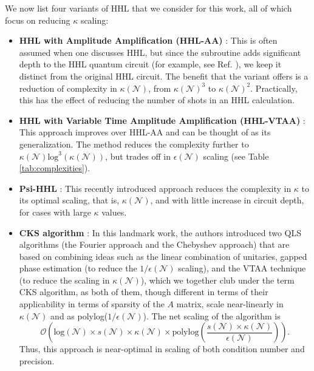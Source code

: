 \documentclass[%
 reprint,
 superscriptaddress,
 amsmath,amssymb,
 aps,
 pra,
floatfix,
nofootinbib,
]{revtex4-2}
\theoremstyle{definition}
\theoremstyle{remark}
\begin{document}
We now list four variants of HHL that we consider for this work, all of which focus on reducing $\kappa$ scaling: 

\begin{itemize}
\item 
\textbf{HHL with Amplitude Amplification (HHL-AA)} \cite{Harrow2009QuantumEquations, Brassard}: 
This is often assumed when one discusses HHL, but since the subroutine adds significant depth to the HHL quantum circuit (for example, see Ref. \cite{morales}), we keep it distinct from the original HHL circuit. The benefit that the variant offers is a reduction of complexity in $\kappa(\mathcal{N})$, from $\kappa(\mathcal{N})^3$ to $\kappa(\mathcal{N})^2$. Practically, this has the effect of reducing the number of shots in an HHL calculation. 

\item 
\textbf{HHL with Variable Time Amplitude Amplification (HHL-VTAA)} \cite{ambainis}: 
This approach improves over HHL-AA and can be thought of as its generalization. The method reduces the complexity further to $\kappa(\mathcal{N}) \mathrm{log}^3(\kappa(\mathcal{N}))$, but trades off in $\epsilon(\mathcal{N})$ scaling (see Table \ref{tab:complexities}). 

\item 
\textbf{Psi-HHL} \cite{psihhl}: 
This recently introduced approach reduces the complexity in $\kappa$ to its optimal scaling, that is, $\kappa(\mathcal{N})$, and with little increase in circuit depth, for cases with large $\kappa$ values. 
\item \textbf{CKS algorithm} \cite{Childs}: 
In this landmark work, the authors introduced two QLS algorithms (the Fourier approach and the Chebyshev approach) that are based on combining ideas such as the linear combination of unitaries, gapped phase estimation (to reduce the $1/\epsilon(\mathcal{N})$ scaling), and the VTAA technique (to reduce the scaling in $\kappa(\mathcal{N})$), which we together club under the term CKS algorithm, as both of them, though different in terms of their applicability in terms of sparsity of the $A$ matrix, scale near-linearly in $\kappa(\mathcal{N})$ and as polylog($1/\epsilon(\mathcal{N})$). The net scaling of the algorithm is 
$$\mathcal{O}\left(\mathrm{log}(\mathcal{N}) \times s(\mathcal{N}) \times \kappa(\mathcal{N})\times \mathrm{polylog}\left(\frac{s(\mathcal{N}) \times \kappa(\mathcal{N})}{\epsilon(\mathcal{N})}\right)\right).$$ 
Thus, this approach is near-optimal in scaling of both condition number and precision. 
\end{itemize}
\end{document}
